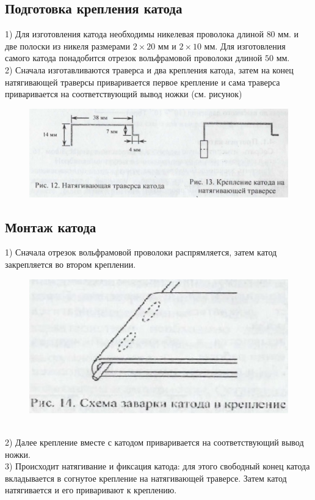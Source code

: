 \documentclass[11pt]{article}
\begin{document}
\subsection{Подготовка крепления катода}
    1) Для изготовления катода необходимы никелевая проволока длиной $80$ мм. и две полоски из никеля размерами $2 \times 20$ мм и  $2 \times 10$ мм. Для изготовления самого катода понадобится отрезок вольфрамовой проволоки длиной $50$ мм.\\
    2) Сначала изготавливаются траверса и два крепления катода, затем на конец натягивающей траверсы приваривается первое крепление и сама траверса приваривается на соответствующий вывод ножки (см. рисунок)\\
\begin{figure}[h]
\begin{center}
\includegraphics[width=13cm]{натягивающая траверса катода.jpg}
\end{center}
\end{figure}
\subsection{Монтаж катода}
   1) Сначала отрезок вольфрамовой проволоки распрямляется, затем катод закрепляется во втором креплении.\\
\begin{figure}[h]
\begin{center}
\includegraphics[width=13cm]{заварка катода.jpg}
\end{center}
\end{figure}\\
  2) Далее крепление вместе с катодом приваривается на соответствующий вывод ножки.\\
   3) Происходит натягивание и фиксация катода: для этого свободный конец катода вкладывается в согнутое крепление на натягивающей траверсе. Затем катод натягивается и его приваривают к креплению.\\
\newpage
\end{document}
